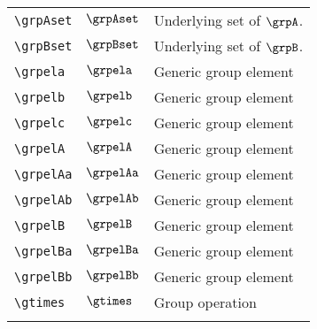 \begin{longtable}{lll}
  {\color[rgb]{0.5,0.5,0.5}\texttt{\textbackslash grpAset}}                                                 & $\grpAset$                 & Underlying set of $\grpA$.\\
  {\color[rgb]{0.5,0.5,0.5}\texttt{\textbackslash grpBset}}                                                 & $\grpBset$                 & Underlying set of $\grpB$.\\
  {\color[rgb]{0.5,0.5,0.5}\texttt{\textbackslash grpela}}                                                  & $\grpela$                  & Generic group element\\
  {\color[rgb]{0.5,0.5,0.5}\texttt{\textbackslash grpelb}}                                                  & $\grpelb$                  & Generic group element\\
  {\color[rgb]{0.5,0.5,0.5}\texttt{\textbackslash grpelc}}                                                  & $\grpelc$                  & Generic group element\\
  {\color[rgb]{0.5,0.5,0.5}\texttt{\textbackslash grpelA}}                                                  & $\grpelA$                  & Generic group element\\
  {\color[rgb]{0.5,0.5,0.5}\texttt{\textbackslash grpelAa}}                                                 & $\grpelAa$                 & Generic group element\\
  {\color[rgb]{0.5,0.5,0.5}\texttt{\textbackslash grpelAb}}                                                 & $\grpelAb$                 & Generic group element\\
  {\color[rgb]{0.5,0.5,0.5}\texttt{\textbackslash grpelB}}                                                  & $\grpelB$                  & Generic group element\\
  {\color[rgb]{0.5,0.5,0.5}\texttt{\textbackslash grpelBa}}                                                 & $\grpelBa$                 & Generic group element\\
  {\color[rgb]{0.5,0.5,0.5}\texttt{\textbackslash grpelBb}}                                                 & $\grpelBb$                 & Generic group element\\
  {\color[rgb]{0.5,0.5,0.5}\texttt{\textbackslash gtimes}}                                                  & $\gtimes$                  & Group operation                                         \\
  &                            &                                                         \\

\end{longtable}
